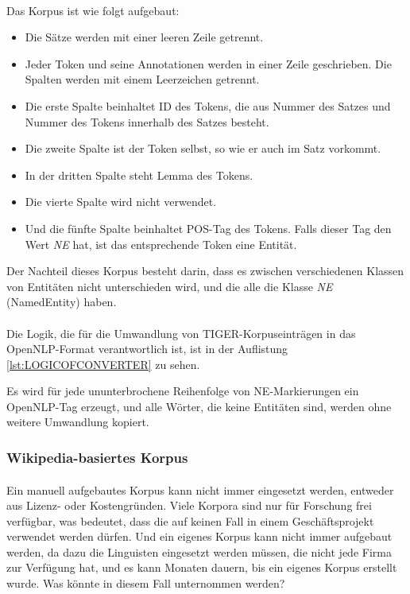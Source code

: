 \paragraph{}
Das Korpus ist wie folgt aufgebaut:
\begin{itemize}
\item Die Sätze werden mit einer leeren Zeile getrennt.
\item Jeder Token und seine Annotationen werden in einer Zeile geschrieben. Die Spalten werden mit einem Leerzeichen getrennt.
\item Die erste Spalte beinhaltet ID des Tokens, die aus Nummer des Satzes und Nummer des Tokens innerhalb des Satzes besteht.
\item Die zweite Spalte ist der Token selbst, so wie er auch im Satz vorkommt.
\item In der dritten Spalte steht Lemma des Tokens.
\item Die vierte Spalte wird nicht verwendet.
\item Und die fünfte Spalte beinhaltet POS-Tag des Tokens. Falls dieser Tag den Wert \textit{NE} hat, ist das entsprechende Token eine Entität.
\end{itemize}

Der Nachteil dieses Korpus besteht darin, dass es zwischen verschiedenen Klassen von Entitäten nicht unterschieden wird, und die alle die Klasse \textit{NE} (NamedEntity) haben.

\paragraph{}
Die Logik, die für die Umwandlung von TIGER-Korpuseinträgen in das OpenNLP-Format verantwortlich ist, ist in der Auflistung \ref{lst:LOGICOFCONVERTER} zu sehen.

Es wird für jede ununterbrochene Reihenfolge von NE-Markierungen ein OpenNLP-Tag erzeugt, und alle Wörter, die keine Entitäten sind, werden ohne weitere Umwandlung kopiert.

\subsubsection{Wikipedia-basiertes Korpus}
\paragraph{}
Ein manuell aufgebautes Korpus kann nicht immer eingesetzt werden, entweder aus Lizenz- oder Kostengründen. Viele Korpora sind nur für Forschung frei verfügbar, was bedeutet, dass die auf keinen Fall in einem Geschäftsprojekt verwendet werden dürfen. Und ein eigenes Korpus kann nicht immer aufgebaut werden, da dazu die Linguisten eingesetzt werden müssen, die nicht jede Firma zur Verfügung hat, und es kann Monaten dauern, bis ein eigenes Korpus erstellt wurde. Was könnte in diesem Fall unternommen werden?


